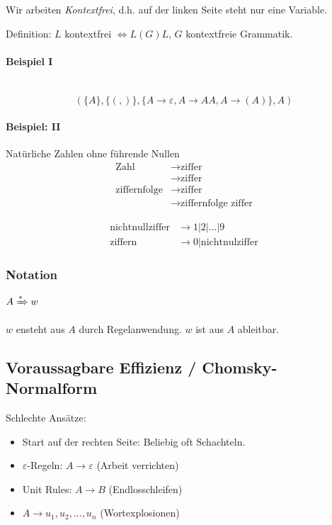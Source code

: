 Wir arbeiten \emph{Kontextfrei}, d.h. auf der linken Seite steht nur eine Variable.

Definition: $L$ kontextfrei $\Leftrightarrow L(G)  L$, $G$ kontextfreie Grammatik.


\paragraph{Beispiel I} \hfill \\
\[
	(\{A\}, \{(,)\}, \{A \to \varepsilon, A \to AA, A \to (A)\}, A)
\]

\paragraph{Beispiel: II}

Natürliche Zahlen ohne führende Nullen
\begin{align*}
	\text{Zahl} &\to \text{ziffer} \\
	\text{} &\to \text{ziffer} \\
	\text{ziffernfolge} &\to \text{ziffer} \\
	\text{} &\to \text{ziffernfolge ziffer}
\end{align*}

\begin{align*}
	\text{nichtnullziffer} &\to 1 | 2 | ... | 9 \\
	\text{ziffern} &\to 0 | \text{nichtnulziffer}
\end{align*}


\subsubsection{Notation}

$A \xRightarrow{\ast} w$

$w$ ensteht aus $A$ durch Regelanwendung. $w$ ist aus $A$ ableitbar.

\subsection{Voraussagbare Effizienz / Chomsky-Normalform}
Schlechte Ansätze:
\begin{itemize}
	\item Start auf der rechten Seite: Beliebig oft Schachteln.
	\item $\varepsilon$-Regeln: $A \to \varepsilon$ (Arbeit verrichten)
	\item Unit Rules: $A \to B$ (Endlosschleifen)
	\item $A \to u_1,u_2,...,u_n$ (Wortexplosionen)
\end{itemize}

